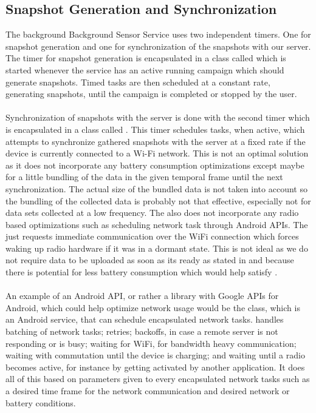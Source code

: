 \subsection{Snapshot Generation and Synchronization}
\label{sub:background_sensor_service_snapshot_generation_and_synchronization}

The background Background Sensor Service uses two independent timers. One for snapshot generation and one for synchronization of the snapshots with our server. The timer for snapshot generation is encapsulated in a class called  which is started whenever the service has an active running campaign which should generate snapshots. Timed tasks are then scheduled at a constant rate, generating snapshots, until the campaign is completed or stopped by the user.
\\\\
Synchronization of snapshots with the server is done with the second timer which is encapsulated in a class called . This timer schedules tasks, when active, which attempts to synchronize gathered snapshots with the server at a fixed rate if the device is currently connected to a Wi-Fi network. This is not an optimal solution as it does not incorporate any battery consumption optimizations except maybe for a little bundling of the data in the given temporal frame until the next synchronization. The actual size of the bundled data is not taken into account so the bundling of the collected data is probably not that effective, especially not for data sets collected at a low frequency. The  also does not incorporate any radio based optimizations such as scheduling network task through Android APIs. The  just requests immediate communication over the WiFi connection which forces waking up radio hardware if it was in a dormant state. This is not ideal as we do not require data to be uploaded as soon as its ready as stated in  and because there is potential for less battery consumption which would help satisfy . 
\\\\
An example of an Android API, or rather a library with Google APIs for Android, which could help optimize network usage would be the  class, which is an Android service, that can schedule encapsulated network tasks.  \parencite{gcmnetworkmanager} handles batching of network tasks; retries; backoffs, in case a remote server is not responding or is busy; waiting for WiFi, for bandwidth heavy communication; waiting with commutation until the device is charging; and waiting until a radio becomes active, for instance by getting activated by another application. It does all of this based on parameters given to every encapsulated network tasks such as a desired time frame for the network communication and desired network or battery conditions.  
